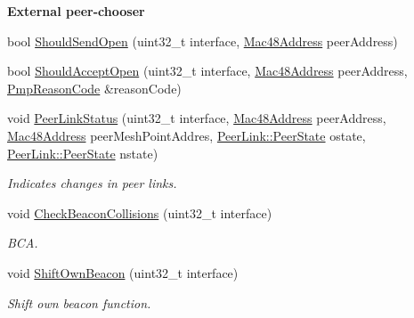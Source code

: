 \begin{Indent}{\bf External peer-\/chooser}\par
\begin{DoxyCompactItemize}
\item 
bool \hyperlink{classns3_1_1dot11s_1_1PeerManagementProtocol_afb7efbd65edee4f9bbe42f0745fcc524}{Should\+Send\+Open} (uint32\+\_\+t interface, \hyperlink{classns3_1_1Mac48Address}{Mac48\+Address} peer\+Address)
\item 
bool \hyperlink{classns3_1_1dot11s_1_1PeerManagementProtocol_a3ea350a079ca1643c7faa18c124de0d9}{Should\+Accept\+Open} (uint32\+\_\+t interface, \hyperlink{classns3_1_1Mac48Address}{Mac48\+Address} peer\+Address, \hyperlink{group__dot11s_ga1132ec5975c87960ceb86ea54481aba6}{Pmp\+Reason\+Code} \&reason\+Code)
\item 
void \hyperlink{classns3_1_1dot11s_1_1PeerManagementProtocol_afffc33ac9aa647564a4449ba487a4cae}{Peer\+Link\+Status} (uint32\+\_\+t interface, \hyperlink{classns3_1_1Mac48Address}{Mac48\+Address} peer\+Address, \hyperlink{classns3_1_1Mac48Address}{Mac48\+Address} peer\+Mesh\+Point\+Addres, \hyperlink{classns3_1_1dot11s_1_1PeerLink_a432024c7d584aebae1ee15aa88ffb06d}{Peer\+Link\+::\+Peer\+State} ostate, \hyperlink{classns3_1_1dot11s_1_1PeerLink_a432024c7d584aebae1ee15aa88ffb06d}{Peer\+Link\+::\+Peer\+State} nstate)
\begin{DoxyCompactList}\small\item\em Indicates changes in peer links. \end{DoxyCompactList}\item 
void \hyperlink{classns3_1_1dot11s_1_1PeerManagementProtocol_abe64c73c24a2981240b5f85fb87a5160}{Check\+Beacon\+Collisions} (uint32\+\_\+t interface)
\begin{DoxyCompactList}\small\item\em B\+CA. \end{DoxyCompactList}\item 
void \hyperlink{classns3_1_1dot11s_1_1PeerManagementProtocol_a9649a96c629c63b98c133fe258340aa9}{Shift\+Own\+Beacon} (uint32\+\_\+t interface)
\begin{DoxyCompactList}\small\item\em Shift own beacon function. \end{DoxyCompactList}\end{DoxyCompactItemize}
\end{Indent}

